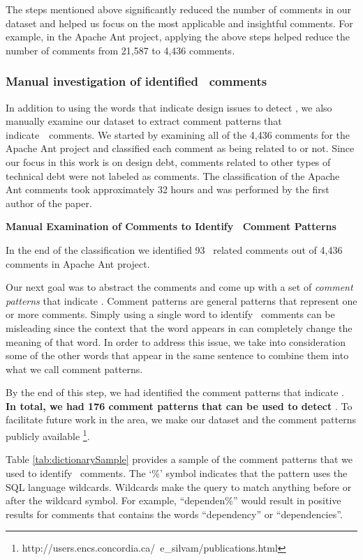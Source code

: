 The steps mentioned above significantly reduced the number of comments in our dataset and helped us focus on the most applicable and insightful comments. For example, in the Apache Ant project, applying the above steps helped reduce the number of comments from 21,587 to 4,436 comments.

\subsubsection{Manual investigation of identified \SADTD~comments} 

In addition to using the words that indicate design issues to detect \SADTD, we also manually examine our dataset to extract comment patterns that indicate~\SADTD~comments. We started by examining all of the 4,436 comments for the Apache Ant project and classified each comment as being related to \SADTD or not. Since our focus in this work is on design debt, comments related to other types of technical debt were not labeled as \SADTD comments. The classification of the Apache Ant comments took approximately 32 hours and was performed by the first author of the paper.

\noindent \textbf{Manual Examination of Comments to Identify \SADTD~Comment Patterns}

In the end of the classification we identified 93 \SADTD~related comments out of 4,436 comments in Apache Ant project.

Our next goal was to abstract the comments and come up with a set of \emph{comment patterns} that indicate \SADTD. Comment patterns are general patterns that represent one or more comments. Simply using a single word to identify \SADTD~comments can be misleading since the context that the word appears in can completely change the meaning of that word. In order to address this issue, we take into consideration some of the other words that appear in the same sentence to combine them into what we call comment patterns. 

By the end of this step, we had identified the comment patterns that indicate \SADTD. \textbf{In total, we had 176 comment patterns that can be used to detect \SADTD}. To facilitate future work in the area, we make our dataset and the comment patterns publicly available \footnote{http://users.encs.concordia.ca/~e\_silvam/publications.html}. 

Table \ref{tab:dictionarySample} provides a sample of the comment patterns that we used to identify \SADTD~comments. The `\%' symbol indicates that the pattern uses the SQL language wildcards. Wildcards make the query to match anything before or after the wildcard symbol. For example, ``dependen\%'' would result in positive results for comments that contains the words ``dependency'' or ``dependencies''.

